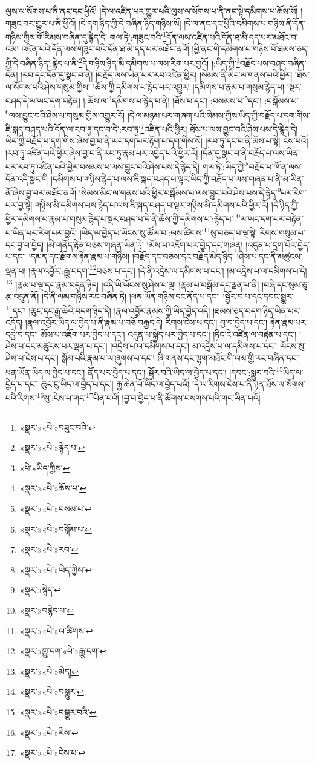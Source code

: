 ལུས་ལ་སོགས་པ་ནི་ནང་དང་ཕྱིའོ། །དེ་ལ་འཛིན་པར་གྱུར་པའི་ལུས་ལ་སོགས་པ་ནི་ནང་སྟེ་དམིགས་པ་ཆོས་སོ། །གཟུང་བར་གྱུར་པ་ནི་ཕྱིའོ། །དེ་དག་ཉིད་ཀྱི་དེ་བཞིན་ཉིད་གཉིས་སོ། །དེ་ལ་ནང་དང་ཕྱིའི་དམིགས་པ་གཉིས་ནི་དོན་གཉིས་ཀྱིས་གོ་རིམས་བཞིན་དུ་རྙེད་དེ། གལ་ཏེ་:གཟུང་བའི་\footnote{«སྣར་»«པེ་»བཟུང་བའི་}དོན་ལས་འཛིན་པའི་དོན་ཐ་མི་དད་པར་མཐོང་བ་འམ། འཛིན་པའི་དོན་ལས་གཟུང་བའི་དོན་ཐ་མི་དད་པར་མཐོང་ནའོ། །ཕྱི་ནང་གི་དམིགས་པ་གཉིས་པོ་ཐམས་ཅད་ཀྱི་དེ་བཞིན་ཉིད་:རྙེད་པ་ནི་\footnote{«སྣར་»«པེ་»རྙེད་པ་}དེ་གཉིས་ཉིད་མི་དམིགས་པ་ལས་རིག་པར་བྱའོ། །:ཡིད་ཀྱི་\footnote{«པེ་»ཡིད་ཀྱིས་}བརྗོད་པས་བཤད་བཞིན་དོན། །རབ་དང་དོན་དུ་སྣང་བ་ནི། །བརྗོད་ལས་ཡིན་པར་རབ་འཛིན་ཕྱིར། །སེམས་ནི་མིང་ལ་གནས་པའི་ཕྱིར། །ཐོས་ལ་སོགས་པའི་ཤེས་གསུམ་གྱིས། །ཆོས་ཀྱི་དམིགས་པ་རྙེད་པར་འགྱུར། །དམིགས་པ་རྣམ་པ་གསུམ་རྙེད་པ། །སྔར་བཤད་དེ་ལ་ཡང་དག་བརྟེན། །:ཆོས་ལ་\footnote{«སྣར་»«པེ་»ཆོས་པ་}དམིགས་པ་རྙེད་པ་ནི། །ཐོས་པ་དང་། :བསམས་པ་\footnote{«སྣར་»«པེ་»བསམ་པ་}དང་། :བསྒོམས་པ་\footnote{«སྣར་»«པེ་»བསྒོམ་པ་}ལས་བྱུང་བའི་ཤེས་པ་གསུམ་གྱིས་འགྱུར་རོ། །དེ་ལ་མཉམ་པར་གཞག་པའི་སེམས་ཀྱིས་ཡིད་ཀྱི་བརྗོད་པ་དག་གིས་ཇི་སྐད་བཤད་པའི་དོན་ལ་རབ་ཏུ་དང་བ་དེ་:རབ་ཏུ་\footnote{«སྣར་»«པེ་»རབ་}འཛིན་པའི་ཕྱིར། ཐོས་པ་ལས་བྱུང་བའི་ཤེས་པས་དེ་རྙེད་དེ། ཡིད་ཀྱི་བརྗོད་པ་དག་གིས་ཞེས་བྱ་བ་ནི་ཡང་དག་པར་རྟོག་པ་དག་གིས་སོ། །རབ་ཏུ་དང་བ་ནི་མོས་པ་སྟེ། ངེས་པའོ། །རབ་ཏུ་འཛིན་པའི་ཕྱིར་ཞེས་བྱ་བ་ནི་རབ་ཏུ་རྣམ་པར་འབྱེད་པའི་ཕྱིར་རོ། །དོན་དུ་སྣང་བ་ནི་བརྗོད་པ་ལས་ཡིན་པར་རབ་ཏུ་འཛིན་པའི་ཕྱིར་བསམས་པ་ལས་བྱུང་བའི་ཤེས་པས་དེ་རྙེད་དེ། གལ་ཏེ་:ཡིད་ཀྱི་\footnote{«སྣར་»«པེ་»ཡིད་ཀྱིས་}བརྗོད་པ་ཁོ་ན་ལས་དོན་འདི་སྣང་གི །དམིགས་པ་གཉིས་རྙེད་པ་ལས་ཇི་སྐད་བཤད་པ་ལྟར་ཡིད་ཀྱི་བརྗོད་པ་ལས་གཞན་པ་ནི་མ་ཡིན་ནོ་ཞེས་བྱ་བར་མཐོང་ནའོ། །སེམས་མིང་ལ་གནས་པའི་ཕྱིར་བསྒོམས་པ་ལས་བྱུང་བའི་ཤེས་པས་དེ་རྙེད་\footnote{«སྣར་»སྙེད་}པར་རིག་པར་བྱ་སྟེ། གཉིས་མི་དམིགས་པས་རྙེད་པ་ལས་ཇི་སྐད་བཤད་པ་ལྟར་གཉིས་མི་དམིགས་པའི་ཕྱིར་རོ། །དེ་ཉིད་ཀྱི་ཕྱིར་དམིགས་པ་རྣམ་པ་གསུམ་རྙེད་པ་སྔར་བཤད་པ་དེ་ནི་ཆོས་ཀྱི་དམིགས་པ་:རྙེད་པ་\footnote{«སྣར་»བརྙེད་པ་}ལ་ཡང་དག་པར་བརྟེན་པ་ཡིན་པར་རིག་པར་བྱའོ། །ཡིད་ལ་བྱེད་པ་ཡོངས་སུ་ཚོལ་བ་:ལས་ཚིགས་\footnote{«སྣར་»«པེ་»ལ་ཚིགས་}སུ་བཅད་པ་ལྔ་སྟེ། རིགས་གསུམ་པ་དང་བྱ་བ་བྱེད། །མི་གནོད་རྟེན་བཅས་གཞན་ཡིན་ཏེ། །མོས་པ་འཇོག་པར་བྱེད་དང་གཞན། །འདུན་པ་དྲག་པོར་བྱེད་པ་དང་། །དམན་དང་རྫོགས་རྟེན་རྣམ་པ་གཉིས། །བརྗོད་དང་བཅས་དང་བརྗོད་མེད་ཉིད། །ཤེས་པ་དང་ནི་མཚུངས་ལྡན་པ། །རྣལ་འབྱོར་:རྒྱུ་བདག་\footnote{«སྣར་»གྱུ་དག་«པེ་»རྒྱུ་དག་}བཅས་པ་དང་། །དེ་ནི་འདྲེས་ལ་དམིགས་པ་དང་། །མ་འདྲེས་པ་ལ་དམིགས་པ་དེ།\footnote{«སྣར་»«པེ་»མེད།} །རྣམ་པ་ལྔ་དང་རྣམ་བདུན་ཉིད། །འདི་ཡི་ཡོངས་སུ་ཤེས་པ་ལྔ། །རྣམ་པ་བསྒོམ་དང་ལྡན་པ་ནི། །བཞི་དང་སུམ་ཅུ་རྩ་བདུན་ནོ། །དེ་ནི་ལམ་གཉིས་རང་བཞིན་ཏེ། །ཕན་ཡོན་གཉིས་དང་ནོད་པ་དང་། །སྦྱོར་བ་པ་དང་དབང་སྒྱུར་\footnote{«སྣར་»«པེ་»བསྒྱུར་}དང་། །ཆུང་དང་རྒྱ་ཆེའི་བདག་ཉིད་དེ། །རྣལ་འབྱོར་རྣམས་ཀྱི་ཡིད་བྱེད་འདི། །ཐམས་ཅད་བདག་ཉིད་ཡིན་པར་འདོད། །རྣལ་འབྱོར་ཡིད་ལ་བྱེད་པ་ནི་རྣམ་པ་བཅོ་བརྒྱད་དེ། རིགས་ངེས་པ་དང་། བྱ་བ་བྱེད་པ་དང་། རྟེན་རྣམ་པར་དབྱེ་བ་དང་། མོས་པ་འཇོག་པར་བྱེད་པ་དང་། འདུན་པ་སྐྱེད་པར་བྱེད་པ་དང་། །ཏིང་ངེ་འཛིན་ལ་བརྟེན་པ་དང་། །ཤེས་པ་དང་མཚུངས་པར་ལྡན་པ་དང་། །འདྲེས་པ་ལ་དམིགས་པ་དང་། མ་འདྲེས་པ་ལ་དམིགས་པ་དང་། ཡོངས་སུ་ཤེས་པ་ངེས་པ་དང་། སྒོམ་པའི་རྣམ་པ་ལ་ཞུགས་པ་དང་། ཞི་གནས་དང་ལྷག་མཐོང་གི་ལམ་གྱི་རང་བཞིན་དང་། ཕན་ཡོན་ཡིད་ལ་བྱེད་པ་དང་། ནོད་པར་བྱེད་པ་དང་། སྦྱོར་བའི་ཡིད་ལ་བྱེད་པ་དང་། །དབང་:སྒྱུར་བའི་\footnote{«སྣར་»«པེ་»བསྒྱུར་བའི་}ཡིད་ལ་བྱེད་པ་དང་། ཆུང་ངུ་ཡིད་ལ་བྱེད་པ་དང་། རྒྱ་ཆེན་པོ་ཡིད་ལ་བྱེད་པའོ། །དེ་ལ་རིགས་ངེས་པ་ནི་ཉན་ཐོས་ལ་སོགས་པའི་རིགས་\footnote{«སྣར་»«པེ་»རིས་}སུ་:ངེས་པ་གང་\footnote{«སྣར་»«པེ་»ངེས་པ་}ཡིན་པའོ། །བྱ་བ་བྱེད་པ་ནི་ཚོགས་བསགས་པའི་གང་ཡིན་པའོ། 
